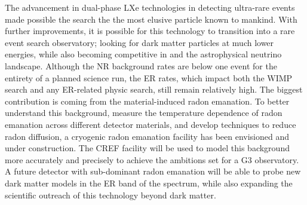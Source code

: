 The advancement in dual-phase LXe technologies in detecting ultra-rare events made possible the search the the most elusive particle known to mankind. With further improvements, it is possible for this technology to transition into a rare event search observatory; looking for dark matter particles at much lower energies, while also becoming competitive in \neutrinolessDoubleBeta{} and the astrophysical neutrino landscape. Although the NR background rates are below one event for the entirety of a planned science run, the ER rates, which impact both the WIMP search and any ER-related physic search, still remain relatively high. The biggest contribution is coming from the material-induced radon emanation. To better understand this background, measure the temperature dependence of radon emanation across different detector materials, and develop techniques to reduce radon diffusion, a cryogenic radon emanation facility has been envisioned and under construction. The CREF facility will be used to model this background more accurately and precisely to achieve the ambitions set for a G3 observatory. A future detector with sub-dominant radon emanation will be able to probe new dark matter models in the ER band of the spectrum, while also expanding the scientific outreach of this technology beyond dark matter.

\\